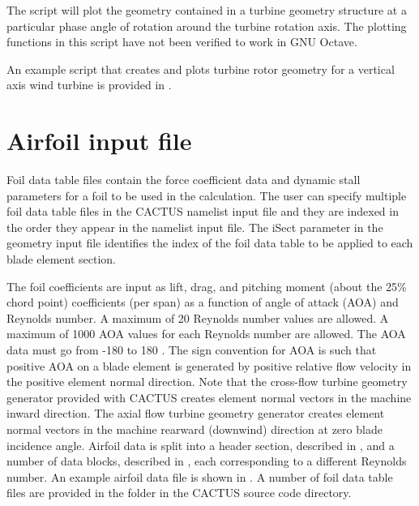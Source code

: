 The script  will plot the geometry contained in a turbine geometry structure at a particular phase angle of rotation around the turbine rotation axis. The plotting functions in this script have not been verified to work in GNU Octave.

An example script that creates and plots turbine rotor geometry for a vertical axis wind turbine is provided in .

\section{Airfoil input file}
Foil data table files contain the force coefficient data and dynamic stall parameters for a foil to be used in the calculation. The user can specify multiple foil data table files in the CACTUS namelist input file and they are indexed in the order they appear in the namelist input file. The iSect parameter in the geometry input file identifies the index of the foil data table to be applied to each blade element section.

The foil coefficients are input as lift, drag, and pitching moment (about the 25\% chord point) coefficients (per span) as a function of angle of attack (AOA) and Reynolds number. A maximum of 20 Reynolds number values are allowed. A maximum of 1000 AOA values for each Reynolds number are allowed. The AOA data must go from -180 \si{\deg} to 180 \si{\deg}. The sign convention for AOA is such that positive AOA on a blade element is generated by positive relative flow velocity in the positive element normal direction. Note that the cross-flow turbine geometry generator provided with CACTUS creates element normal vectors in the machine inward direction. The axial flow turbine geometry generator creates element normal vectors in the machine rearward (downwind) direction at zero blade incidence angle.
Airfoil data is split into a header section, described in , and a number of data blocks, described in , each corresponding to a different Reynolds number. An example airfoil data file is shown in . A number of foil data table files are provided in the  folder in the CACTUS source code directory.


